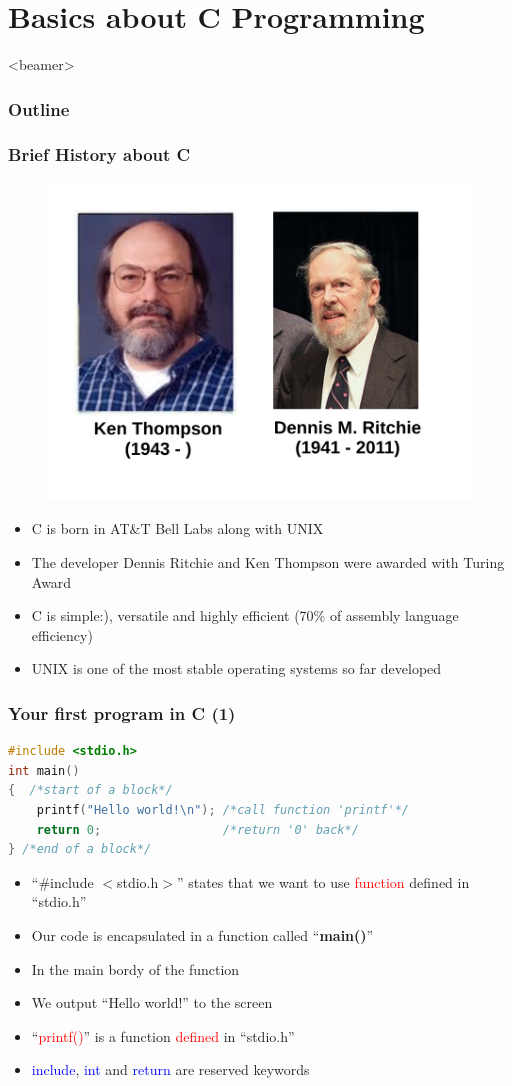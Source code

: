 \section{Basics about C Programming}
\label{sec:basics}
\begin{frame}<beamer>
    \frametitle{Outline}
    \tableofcontents[currentsection]
\end{frame}

\begin{frame}
	\frametitle{Brief History about C}
	\vspace{-0.1in}
\begin{figure}
	\includegraphics[width=0.5\linewidth]{figs/cuunix.pdf}
\end{figure}
\begin{itemize}
	\item {C is born in AT\&T Bell Labs along with UNIX}
	\item {The developer Dennis Ritchie and Ken Thompson were awarded with Turing Award}
	\item {C is simple:), versatile and highly efficient (70\% of assembly language efficiency)}
	\item {UNIX is one of the most stable operating systems so far developed}
\end{itemize}
\end{frame}

\begin{frame}[fragile]
	\frametitle{Your first program in C (1)}
\begin{lstlisting}[language=c]
#include <stdio.h>
int main()
{  /*start of a block*/
    printf("Hello world!\n"); /*call function 'printf'*/
    return 0;                 /*return '0' back*/
} /*end of a block*/
\end{lstlisting}
\vspace{-0.15in}
\begin{itemize}
		\item {``\#include $<$stdio.h$>$'' states that we want to use \textcolor{red}{function} defined in ``stdio.h'' }
		\item {Our code is encapsulated in a function called ``\textbf{main()}''}
		\item {In the main bordy of the function}
		\item {We output ``Hello world!'' to the screen}
		\item {``\textcolor{red}{printf()}'' is a function \textcolor{red}{defined} in ``stdio.h''}
		\item {\textcolor{blue}{include}, \textcolor{blue}{int} and \textcolor{blue}{return} are reserved keywords}
	\end{itemize}

\end{frame}


